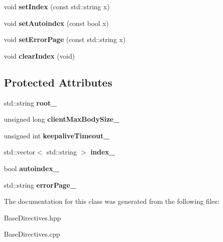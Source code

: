 \begin{DoxyCompactItemize}
\mbox{\label{classft_1_1BaseDirectives_a6de3598412fe53d93d2214e6b183a778}} 
void {\bfseries set\+Index} (const std\+::string x)
\item 
\mbox{\label{classft_1_1BaseDirectives_a2979d3370c229f939887b6872ddb26f0}} 
void {\bfseries set\+Autoindex} (const bool x)
\item 
\mbox{\label{classft_1_1BaseDirectives_ab8f6ec9dd8cb72cd419181ffd1040fcc}} 
void {\bfseries set\+Error\+Page} (const std\+::string x)
\item 
\mbox{\label{classft_1_1BaseDirectives_aa81c486136354bf8e800b290f861f013}} 
void {\bfseries clear\+Index} (void)
\end{DoxyCompactItemize}
\subsection*{Protected Attributes}
\begin{DoxyCompactItemize}
\item 
\mbox{\label{classft_1_1BaseDirectives_affbd74aa1e825d772b67a1335ee85741}} 
std\+::string {\bfseries root\+\_\+}
\item 
\mbox{\label{classft_1_1BaseDirectives_a3fb7086b9fe2b16943f6e938d5f01c9a}} 
unsigned long {\bfseries client\+Max\+Body\+Size\+\_\+}
\item 
\mbox{\label{classft_1_1BaseDirectives_a2327889c130860c6ad086d9791aaa077}} 
unsigned int {\bfseries keepalive\+Timeout\+\_\+}
\item 
\mbox{\label{classft_1_1BaseDirectives_a3193c5c0e1a952087f11be2ee8372016}} 
std\+::vector$<$ std\+::string $>$ {\bfseries index\+\_\+}
\item 
\mbox{\label{classft_1_1BaseDirectives_af102e2fa0d19c435b8bf3595efe4277a}} 
bool {\bfseries autoindex\+\_\+}
\item 
\mbox{\label{classft_1_1BaseDirectives_ac923f7311578b1fcbfce9d80ca2fb0bf}} 
std\+::string {\bfseries error\+Page\+\_\+}
\end{DoxyCompactItemize}


The documentation for this class was generated from the following files\+:\begin{DoxyCompactItemize}
\item 
Base\+Directives.\+hpp\item 
Base\+Directives.\+cpp\end{DoxyCompactItemize}
